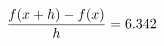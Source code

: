 \documentclass[preview]{standalone}
\begin{document}
\begin{align*}
\special{dvisvgm:raw <g id='unique000'>}\frac{f(x+h)-f(x)}{h} = 6.342\special{dvisvgm:raw </g>}
\end{align*}
\end{document}
